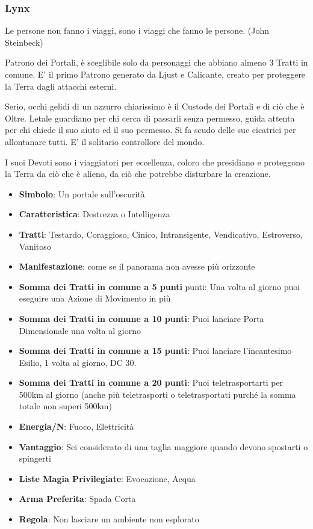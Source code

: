 \begin{multicols}{2}
\subsubsection{Lynx}\label{lynx}\hypertarget{lynx}{}

\begin{enfasi}{
Le persone non fanno i viaggi, sono i viaggi che fanno le persone. (John Steinbeck)}
\end{enfasi}

Patrono dei Portali, è sceglibile solo da personaggi che abbiano almeno 3 Tratti in comune. E' il primo Patrono generato da Ljust e Calicante, creato per proteggere la Terra dagli attacchi esterni.

Serio, occhi gelidi di un azzurro chiarissimo è il Custode dei Portali e di ciò che è Oltre. Letale guardiano per chi cerca di passarli senza permesso, guida attenta per chi chiede il suo aiuto ed il suo permesso. Si fa scudo delle sue cicatrici per allontanare tutti. E' il solitario controllore del mondo.

I suoi Devoti sono i viaggiatori per eccellenza, coloro che presidiano e proteggono la Terra da ciò che è alieno, da ciò che potrebbe disturbare la creazione.

\begin{itemize}[leftmargin=*] \setlength{\itemsep}{0pt}
\item \textbf{Simbolo}: Un portale sull'oscurità
\item \textbf{Caratteristica}: Destrezza o Intelligenza
\item \textbf{Tratti}: Testardo, Coraggioso, Cinico, Intransigente, Vendicativo, Estroverso, Vanitoso
\item \textbf{Manifestazione}: come se il panorama non avesse più orizzonte
\item \textbf{Somma dei Tratti in comune a 5 punti} punti: Una volta al giorno puoi eseguire una Azione di Movimento in più
\item \textbf{Somma dei Tratti in comune a 10 punti}: Puoi lanciare Porta Dimensionale una volta al giorno
\item \textbf{Somma dei Tratti in comune a 15 punti}: Puoi lanciare l'incantesimo Esilio, 1 volta al giorno, DC 30.
\item \textbf{Somma dei Tratti in comune a 20 punti}: Puoi teletrasportarti per 500km al giorno (anche più teletrasporti o teletrasportati purché la somma totale non superi 500km)
\item \textbf{Energia/N}: Fuoco, Elettricità
\item \textbf{Vantaggio}: Sei considerato di una taglia maggiore quando devono spostarti o spingerti
\item \textbf{Liste Magia Privilegiate}: Evocazione, Acqua
\item \textbf{Arma Preferita}: Spada Corta
\item \textbf{Regola}: Non lasciare un ambiente non esplorato
\end{itemize}


\end{multicols}
